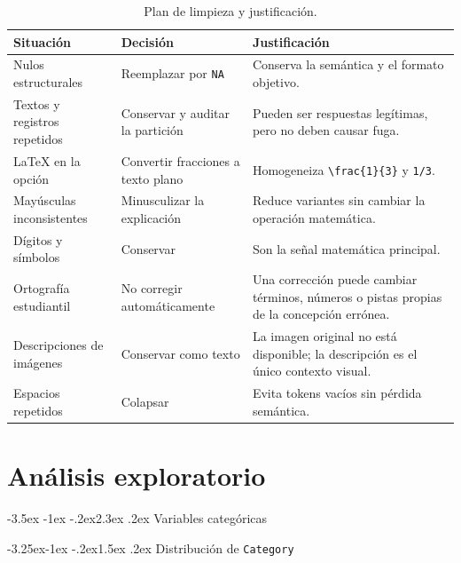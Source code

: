 \documentclass[11pt,oneside,openany]{book}
\makeatletter
\renewcommand\section{\@startsection{section}{1}{\z@}%
  {-3.5ex \@plus -1ex \@minus -.2ex}{2.3ex \@plus .2ex}%
  {\normalfont\Large\sffamily\bfseries\color{AzulMedio}}}
\renewcommand\subsection{\@startsection{subsection}{2}{\z@}%
  {-3.25ex\@plus -1ex \@minus -.2ex}{1.5ex \@plus .2ex}%
  {\normalfont\large\sffamily\bfseries\color{TurquesaOscuro}}}
\newcommand{\codigo}[1]{\texttt{#1}}
\makeatother
\begin{document}
\begin{table}[htbp]
\centering
\caption{Plan de limpieza y justificación.}
\label{tab:limpieza}
\begin{tabularx}{\textwidth}{@{}p{4.0cm}p{3.8cm}Y@{}}
\toprule
\textbf{Situación} & \textbf{Decisión} & \textbf{Justificación}\\
\midrule
Nulos estructurales & Reemplazar por \codigo{NA} & Conserva la semántica y el
formato objetivo.\\
Textos y registros repetidos & Conservar y auditar la partición & Pueden ser
respuestas legítimas, pero no deben causar fuga.\\
LaTeX en la opción & Convertir fracciones a texto plano & Homogeneiza
\codigo{\textbackslash frac\{1\}\{3\}} y \codigo{1/3}.\\
Mayúsculas inconsistentes & Minusculizar la explicación & Reduce variantes sin
cambiar la operación matemática.\\
Dígitos y símbolos & Conservar & Son la señal matemática principal.\\
Ortografía estudiantil & No corregir automáticamente & Una corrección puede
cambiar términos, números o pistas propias de la concepción errónea.\\
Descripciones de imágenes & Conservar como texto & La imagen original no está
disponible; la descripción es el único contexto visual.\\
Espacios repetidos & Colapsar & Evita tokens vacíos sin pérdida semántica.\\
\bottomrule
\end{tabularx}
\end{table}

\chapter{Análisis exploratorio}
\label{ch:eda}

\section{Variables categóricas}

\subsection{Distribución de \codigo{Category}}
\end{document}
